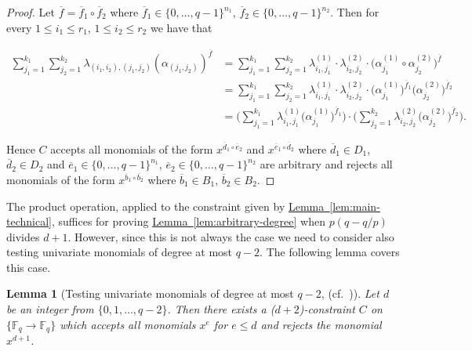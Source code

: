\documentclass[10pt]{article}
\newtheorem{lemma}[theorem]{Lemma}
\theoremstyle{definition}
\numberwithin{equation}{section}
\newcommand{\expref}[2]{\texorpdfstring{\hyperref[#2]{#1~\ref{#2}}}{#1~\ref{#2}}}
\newcommand{\F}{{\mathbb{F}}}
\begin{document}
\begin{proof}

Let $\overline f = \overline f_1 \circ \overline f_2$ where $\overline f_1 \in \{0,\ldots,q-1\}^{n_1}$, $\overline f_2 \in \{0,\ldots,q-1\}^{n_2}$.
Then for every $1 \leq i_1 \leq r_1$, $1 \leq i_2 \leq r_2$ we have that

\begin{align*}
\sum_{j_1=1}^{k_1} \sum_{j_2=1}^{k_2} \lambda_{(i_1,i_2),(j_1,j_2)} (\alpha_{(j_1,j_2)})^{\overline f} & = 
\sum_{j_1=1}^{k_1} \sum_{j_2=1}^{k_2}  \lambda^{(1)}_{i_1,j_1} \cdot \lambda^{(2)}_{i_2,j_2} \cdot \big(\alpha^{(1)}_{j_1} \circ  \alpha^{(2)}_{j_2}\big)^{\overline f} \\
& = \sum_{j_1=1}^{k_1} \sum_{j_2=1}^{k_2}  \lambda^{(1)}_{i_1,j_1} \cdot \lambda^{(2)}_{i_2,j_2} \cdot \big(\alpha^{(1)}_{j_1}\big)^{\overline f_1}  \big(\alpha^{(2)}_{j_2}\big)^{\overline f_2} \\
%
& =  \bigg( \sum_{j_1=1}^{k_1}\lambda^{(1)}_{i_1,j_1}  \big(\alpha^{(1)}_{j_1} \big)^{\overline f_1}\bigg) \cdot  \bigg( \sum_{j_2=1}^{k_2}\lambda^{(2)}_{i_2,j_2}  \big(\alpha^{(2)}_{j_2}\big)^{\overline f_2}\bigg).
\end{align*}

Hence $C$ accepts all monomials of the form $x^{\overline d_1 \circ  \overline e_2}$ and $x^{\overline e_1 \circ \overline d_2}$ where
$\overline d_1 \in D_1$, $\overline d_2 \in D_2$ and $\overline e_1 \in \{0,\ldots,q-1\}^{n_1}$, $\overline e_2 \in \{0,\ldots,q-1\}^{n_2}$ are arbitrary and
 rejects all monomials of the form $x^{\overline b_1 \circ \overline b_2}$ where $\overline b_1 \in B_1$, $\overline b_2 \in B_2$.
\end{proof}

The product operation, applied to the constraint given by \expref{Lemma}{lem:main-technical}, suffices for proving \expref{Lemma}{lem:arbitrary-degree} when $p(q-q/p)$ divides $d+1$. However, since this is not always the case we need to consider also testing univariate monomials of degree at most $q-2$. The following lemma covers this case.

%
%

\begin{lemma}[Testing univariate monomials of degree at most $q-2$, (cf.~\cite{RS96})]\label{lem:constraint-uni}
Let $d$ be an integer %
from
$\{0,1,\ldots ,q-2\}$. Then there exists a ($d+2$)-constraint $C$ on $\{\F_q \to \F_q\}$ which accepts all monomials
$x^e$ for $e \leq d$ and rejects the monomial $x^{d+1}$.
\end{lemma}
\end{document}
